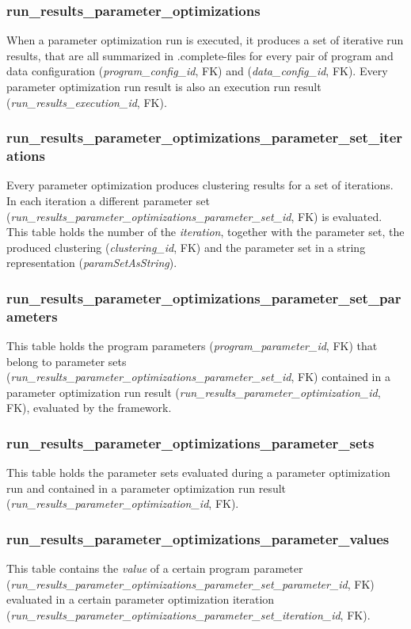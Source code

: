 	\subsubsection{run\_results\_parameter\_optimizations}
	When a parameter optimization run is executed, it produces a set of iterative run results, that are all summarized in .complete-files for every pair of program and data configuration (\textit{program\_config\_id}, FK) and (\textit{data\_config\_id}, FK). Every parameter optimization run result is also an execution run result (\textit{run\_results\_execution\_id}, FK).
	
	\subsubsection{run\_results\_parameter\_optimizations\_parameter\_set\_iterations}
	Every parameter optimization produces clustering results for a set of iterations. In each iteration a different parameter set (\textit{run\_results\_parameter\_optimizations\_parameter\_set\_id}, FK) is evaluated. This table holds the number of the \textit{iteration}, together with the parameter set, the produced clustering (\textit{clustering\_id}, FK) and the parameter set in a string representation (\textit{paramSetAsString}).
	
	\subsubsection{run\_results\_parameter\_optimizations\_parameter\_set\_parameters}
	This table holds the program parameters (\textit{program\_parameter\_id}, FK) that belong to parameter sets (\textit{run\_results\_parameter\_optimizations\_parameter\_set\_id}, FK) contained in a parameter optimization run result (\textit{run\_results\_parameter\_optimization\_id}, FK), evaluated by the framework.
	
	\subsubsection{run\_results\_parameter\_optimizations\_parameter\_sets}
	This table holds the parameter sets evaluated during a parameter optimization run and contained in a parameter optimization run result (\textit{run\_results\_parameter\_optimization\_id}, FK).
	
	\subsubsection{run\_results\_parameter\_optimizations\_parameter\_values}
	This table contains the \textit{value} of a certain program parameter (\textit{run\_results\_parameter\_optimizations\_parameter\_set\_parameter\_id}, FK) evaluated in a certain parameter optimization iteration (\textit{run\_results\_parameter\_optimizations\_parameter\_set\_iteration\_id}, FK).
	
